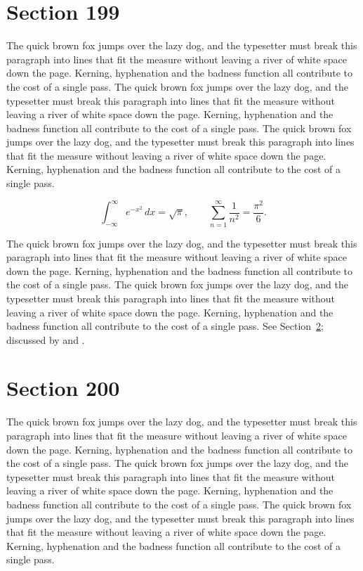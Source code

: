 \documentclass{article}
\begin{document}
\section{Section 199}
\label{sec:199}
The quick brown fox jumps over the lazy dog, and the typesetter must break this paragraph into lines that fit the measure without leaving a river of white space down the page. Kerning, hyphenation and the badness function all contribute to the cost of a single pass. The quick brown fox jumps over the lazy dog, and the typesetter must break this paragraph into lines that fit the measure without leaving a river of white space down the page. Kerning, hyphenation and the badness function all contribute to the cost of a single pass. The quick brown fox jumps over the lazy dog, and the typesetter must break this paragraph into lines that fit the measure without leaving a river of white space down the page. Kerning, hyphenation and the badness function all contribute to the cost of a single pass. 

\begin{equation}\label{eq:199}
\int_{-\infty}^{\infty} e^{-x^{2}}\,dx = \sqrt{\pi}, \qquad
\sum_{n=1}^{\infty} \frac{1}{n^{2}} = \frac{\pi^{2}}{6}.
\end{equation}

The quick brown fox jumps over the lazy dog, and the typesetter must break this paragraph into lines that fit the measure without leaving a river of white space down the page. Kerning, hyphenation and the badness function all contribute to the cost of a single pass. The quick brown fox jumps over the lazy dog, and the typesetter must break this paragraph into lines that fit the measure without leaving a river of white space down the page. Kerning, hyphenation and the badness function all contribute to the cost of a single pass. 
See Section~\ref{sec:200}; discussed by \textcite{k5} and \textcite{l2}.
\section{Section 200}
\label{sec:200}
The quick brown fox jumps over the lazy dog, and the typesetter must break this paragraph into lines that fit the measure without leaving a river of white space down the page. Kerning, hyphenation and the badness function all contribute to the cost of a single pass. The quick brown fox jumps over the lazy dog, and the typesetter must break this paragraph into lines that fit the measure without leaving a river of white space down the page. Kerning, hyphenation and the badness function all contribute to the cost of a single pass. The quick brown fox jumps over the lazy dog, and the typesetter must break this paragraph into lines that fit the measure without leaving a river of white space down the page. Kerning, hyphenation and the badness function all contribute to the cost of a single pass. 
\end{document}
